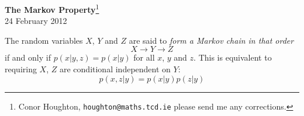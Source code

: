 \documentclass[12pt]{article}
\begin{document}
\begin{center}{\Large
{\bf The Markov Property}\footnote{Conor Houghton, {\tt houghton@maths.tcd.ie} please
send me any corrections.}}\\[1cm] 24 February 2012\\[1cm]
\end{center}
The random variables $X$, $Y$ and $Z$ are said to {\sl form a Markov chain in that order}
\begin{equation}
X\rightarrow Y\rightarrow Z
\end{equation}
if and only if $p(x|y,z)=p(x|y)$ for all $x$, $y$ and $z$. This is equivalent to requiring $X$, $Z$ are conditional independent on $Y$:
\begin{equation}
p(x,z|y)=p(x|y)p(z|y)
\end{equation}
\end{document}

